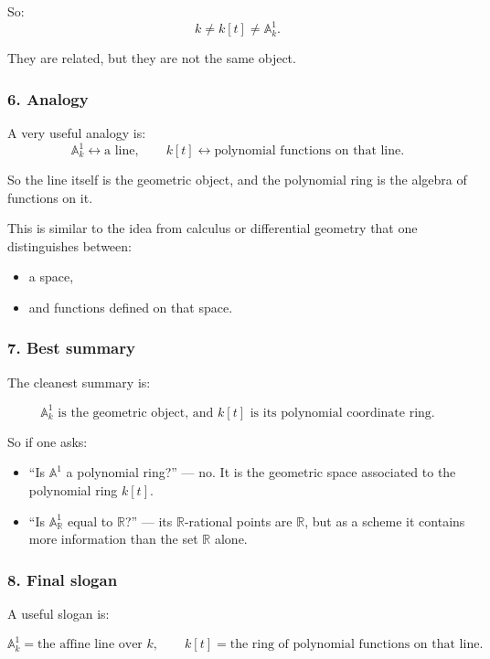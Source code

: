 \documentclass[12pt,a4paper]{article}
\theoremstyle{plain}
\theoremstyle{definition}      %
\begin{document}
	So:
	\[
	k \neq k[t] \neq \mathbb A^1_k.
	\]
	
	They are related, but they are not the same object.
	
	\subsubsection*{6. Analogy}
	
	A very useful analogy is:
	\[
	\mathbb A^1_k
	\longleftrightarrow
	\text{a line},
	\qquad
	k[t]
	\longleftrightarrow
	\text{polynomial functions on that line}.
	\]
	
	So the line itself is the geometric object, and the polynomial ring is the algebra of functions on it.
	
	This is similar to the idea from calculus or differential geometry that one distinguishes between:
	\begin{itemize}
		\item a space,
		\item and functions defined on that space.
	\end{itemize}
	
	\subsubsection*{7. Best summary}
	
	The cleanest summary is:
	
	\[
	\boxed{
		\mathbb A^1_k \text{ is the geometric object, and } k[t] \text{ is its polynomial coordinate ring.}
	}
	\]
	
	So if one asks:
	
	\begin{itemize}
		\item ``Is \(\mathbb A^1\) a polynomial ring?'' --- no. It is the geometric space associated to the polynomial ring \(k[t]\).
		\item ``Is \(\mathbb A^1_{\mathbb R}\) equal to \(\mathbb R\)?'' --- its \(\mathbb R\)-rational points are \(\mathbb R\), but as a scheme it contains more information than the set \(\mathbb R\) alone.
	\end{itemize}
	
	\subsubsection*{8. Final slogan}
	
	A useful slogan is:
	
	\[
	\boxed{
		\mathbb A^1_k=\text{the affine line over }k,
		\qquad
		k[t]=\text{the ring of polynomial functions on that line.}
	}
	\]
	
\end{document}

